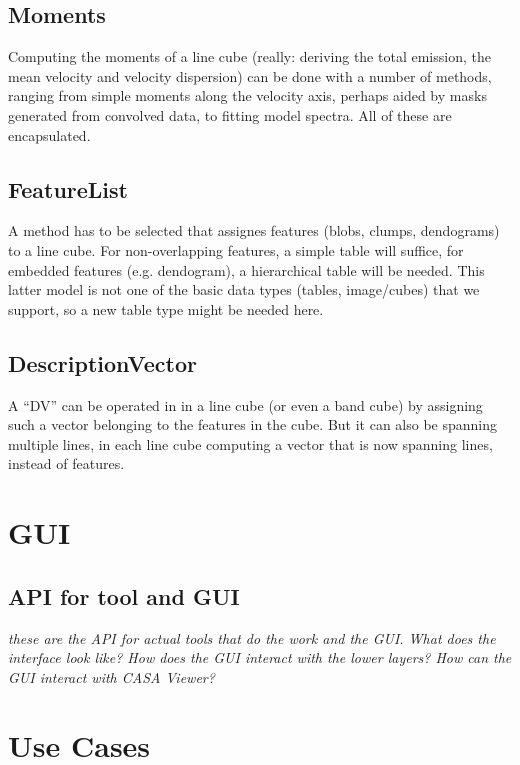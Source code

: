 \documentclass{article}
\begin{document}
\subsection{Moments}

Computing the moments of a line cube (really: deriving the total
emission, the mean velocity and velocity dispersion) can be done
with a number of methods, ranging from simple moments along the
velocity axis, perhaps aided by masks generated from convolved
data, to fitting model spectra. All of these are encapsulated.


\subsection{FeatureList}

A method has to be selected that assignes features  (blobs, clumps, 
dendograms) to a line cube.  For non-overlapping features, a simple
table will suffice, for embedded features (e.g. dendogram),
a hierarchical table will be needed. This latter model is not one of
the basic data types (tables, image/cubes) that we support, so a
new table type might be needed here.

\subsection{DescriptionVector}

A ``DV'' can be operated in in a line cube (or even a band cube) by assigning
such a vector belonging to the features in the cube. But it can also be
spanning multiple lines, in each line cube computing a vector that is now
spanning lines, instead of features.


\section{GUI}


\subsection{API for tool and GUI}

{\it these are the API for actual tools that do the
work and the GUI. What does the interface look like?
How does the GUI interact with the lower layers? How
can the GUI interact with CASA Viewer?}

\section{Use Cases}
\end{document}
